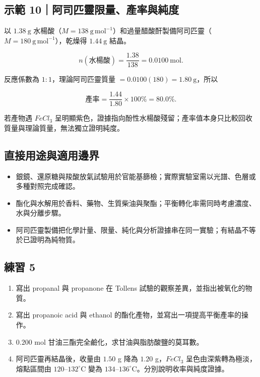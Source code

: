 \documentclass[11pt,a4paper]{article}
\newcounter{none}
\providecommand{\tightlist}{%
  \setlength{\itemsep}{0pt}\setlength{\parskip}{0pt}}
\begin{document}
\begin{HandoutWorkedExample}

\subsection{示範 10｜阿司匹靈限量、產率與純度}\label{ux793aux7bc4-10ux963fux53f8ux5339ux9748ux9650ux91cfux7522ux7387ux8207ux7d14ux5ea6}

以 \(1.38\ \mathrm g\) 水楊酸（\(M=138\ \mathrm{g\,mol^{-1}}\)）和過量醋酸酐製備阿司匹靈（\(M=180\ \mathrm{g\,mol^{-1}}\)），乾燥得 \(1.44\ \mathrm g\) 結晶。

\[
n(\text{水楊酸})=\frac{1.38}{138}=0.0100\ \mathrm{mol}.
\]

反應係數為 \(1:1\)，理論阿司匹靈質量 \(=0.0100(180)=1.80\ \mathrm g\)，所以

\[
\text{產率}=\frac{1.44}{1.80}\times100\%=80.0\%.
\]

若產物遇 \(FeCl_3\) 呈明顯紫色，證據指向酚性水楊酸殘留；產率值本身只比較回收質量與理論質量，無法獨立證明純度。

\end{HandoutWorkedExample}

\subsection{直接用途與適用邊界}\label{ux76f4ux63a5ux7528ux9014ux8207ux9069ux7528ux908aux754c-4}

\begin{itemize}
\tightlist
\item
  銀鏡、還原糖與羧酸放氣試驗用於官能基篩檢；實際實驗室需以光譜、色層或多種對照完成確認。
\item
  酯化與水解用於香料、藥物、生質柴油與聚酯；平衡轉化率需同時考慮濃度、水與分離步驟。
\item
  阿司匹靈製備把化學計量、限量、純化與分析證據串在同一實驗；有結晶不等於已證明為純物質。
\end{itemize}

\subsection{練習 5}\label{ux7df4ux7fd2-5}

\begin{enumerate}
\def\labelenumi{\arabic{enumi}.}
\tightlist
\item
  寫出 propanal 與 propanone 在 Tollens 試驗的觀察差異，並指出被氧化的物質。
\item
  寫出 propanoic acid 與 ethanol 的酯化產物，並寫出一項提高平衡產率的操作。
\item
  \(0.200\) mol 甘油三酯完全鹼化，求甘油與脂肪酸鹽的莫耳數。
\item
  阿司匹靈再結晶後，收量由 \(1.50\) g 降為 \(1.20\) g，\(FeCl_3\) 呈色由深紫轉為極淡，熔點區間由 \(120\)--\(132^\circ\mathrm C\) 變為 \(134\)--\(136^\circ\mathrm C\)。分別說明收率與純度證據。
\end{enumerate}
\end{document}
